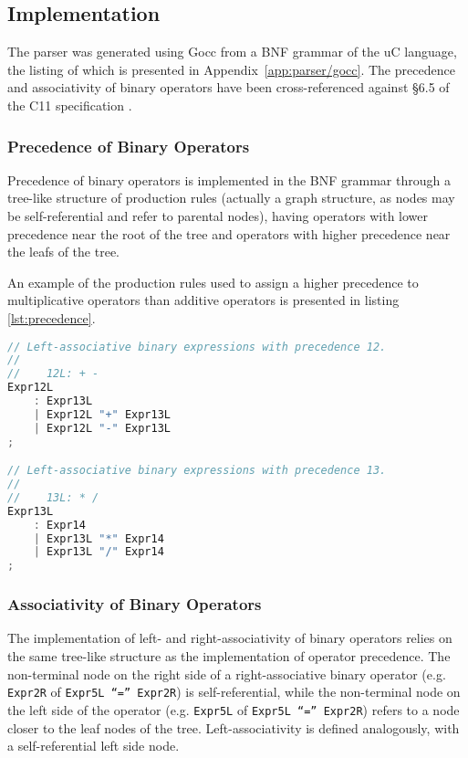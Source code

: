 \subsection{Implementation}

The parser was generated using Gocc from a BNF grammar of the uC language, the listing of which is presented in Appendix~\ref{app:parser/gocc}. The precedence and associativity of binary operators have been cross-referenced against §6.5 of the C11 specification \cite{c11_spec}.

\subsubsection{Precedence of Binary Operators}

Precedence of binary operators is implemented in the BNF grammar through a tree-like structure of production rules (actually a graph structure, as nodes may be self-referential and refer to parental nodes), having operators with lower precedence near the root of the tree and operators with higher precedence near the leafs of the tree.

An example of the production rules used to assign a higher precedence to multiplicative operators than additive operators is presented in listing \ref{lst:precedence}.

\begin{lstlisting}[language=go,style=go,caption={\label{lst:precedence}Precedence of binary expressions.}]
// Left-associative binary expressions with precedence 12.
//
//    12L: + -
Expr12L
	: Expr13L
	| Expr12L "+" Expr13L
	| Expr12L "-" Expr13L
;

// Left-associative binary expressions with precedence 13.
//
//    13L: * /
Expr13L
	: Expr14
	| Expr13L "*" Expr14
	| Expr13L "/" Expr14
;
\end{lstlisting}

\subsubsection{Associativity of Binary Operators}

The implementation of left- and right-associativity of binary operators relies on the same tree-like structure as the implementation of operator precedence. The non-terminal node on the right side of a right-associative binary operator (e.g. \texttt{Expr2R} of \texttt{Expr5L ``='' Expr2R}) is self-referential, while the non-terminal node on the left side of the operator (e.g. \texttt{Expr5L} of \texttt{Expr5L ``='' Expr2R}) refers to a node closer to the leaf nodes of the tree. Left-associativity is defined analogously, with a self-referential left side node.

